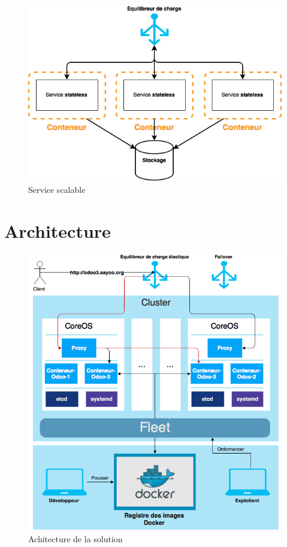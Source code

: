 \begin{onehalfspace}
\begin{figure}[H]
\centering
\includegraphics [scale=0.5]{chapitre4/assets/stateless}
\caption{Service scalable}
\label{fig:scalable}
\end{figure}


\section{Architecture}

\begin{figure}[H]
\centering
\includegraphics [scale=0.7]{chapitre4/assets/architecture}
\caption{Achitecture de la solution}
\label{fig:architecture}
\end{figure}


\end{onehalfspace}
